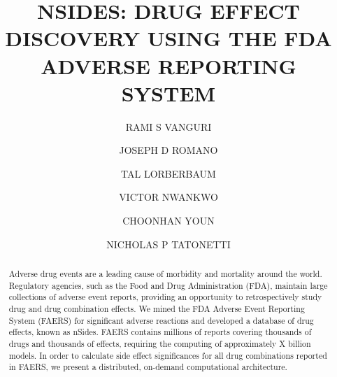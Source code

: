 \documentclass{ws-procs11x85}
\begin{document}
\title{NSIDES: DRUG EFFECT DISCOVERY USING THE FDA ADVERSE REPORTING SYSTEM}

\author{RAMI S VANGURI}

\address{Department of Biomedical Informatics, Columbia University,\\
New York, NY 10032 USA\\
E-mail: r.vanguri@columbia.edu}

\author{JOSEPH D ROMANO}

\address{Department of Biomedical Informatics, Columbia University,\\
New York, NY 10032 USA\\
E-mail: r.vanguri@columbia.edu}

\author{TAL LORBERBAUM}

\address{Department of Biomedical Informatics, Columbia University,\\
New York, NY 10032 USA\\
E-mail: r.vanguri@columbia.edu}

\author{VICTOR NWANKWO}

\address{Department of Biomedical Informatics, Columbia University,\\
New York, NY 10032 USA\\
E-mail: r.vanguri@columbia.edu}

\author{CHOONHAN YOUN}

\address{San Diego Supercomputer Center, University of California, San Diego,\\
La Jolla, CA 92093 USA\\
E-mail: cyoun@sdsc.edu}

\author{NICHOLAS P TATONETTI}

\address{Department of Biomedical Informatics, Columbia University,\\
New York, NY 10032 USA\\
E-mail: nick.tatonetti@columbia.edu}

\begin{abstract}
Adverse drug events are a leading cause of morbidity and mortality
around the world. Regulatory agencies, such as the Food and Drug
Administration (FDA), maintain large collections of adverse event
reports, providing an opportunity to retrospectively study drug and drug combination effects. 
We mined the FDA Adverse Event Reporting System (FAERS) for significant adverse reactions and developed a database of drug
effects, known as nSides. FAERS contains millions of reports covering
thousands of drugs and thousands of effects, requiring the computing of approximately X billion models.  
In order to calculate side effect significances for all drug combinations reported in
FAERS, we present a distributed, on-demand computational architecture.
\end{abstract}
\end{document}

